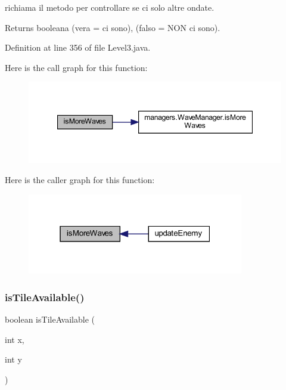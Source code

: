 richiama il metodo per controllare se ci solo altre ondate. 

\begin{DoxyReturn}{Returns}
booleana (vera = ci sono), (falso = N\+ON ci sono). 
\end{DoxyReturn}


Definition at line 356 of file Level3.\+java.

Here is the call graph for this function\+:\nopagebreak
\begin{figure}[H]
\begin{center}
\leavevmode
\includegraphics[width=347pt]{classscenes_1_1_level3_a999f12a033f49f299ad7f55bcae24447_cgraph}
\end{center}
\end{figure}
Here is the caller graph for this function\+:\nopagebreak
\begin{figure}[H]
\begin{center}
\leavevmode
\includegraphics[width=268pt]{classscenes_1_1_level3_a999f12a033f49f299ad7f55bcae24447_icgraph}
\end{center}
\end{figure}
\mbox{\label{classscenes_1_1_level3_aaeac2ee6b3a920a21928ee7b3dc8e7a9}} 
\subsubsection{\texorpdfstring{is\+Tile\+Available()}{isTileAvailable()}}
{\footnotesize\ttfamily boolean is\+Tile\+Available (\begin{DoxyParamCaption}\item[{int}]{x,  }\item[{int}]{y }\end{DoxyParamCaption})\hspace{0.3cm}{\ttfamily [private]}}



